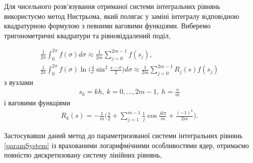 \documentclass[12pt]{report}
\begin{document}
Для чисельного розв'язування отриманої системи інтегральних рівнянь використуємо метод Нистрьома, який полягає у заміні інтегралу вiдповiдною квадратурною формулою з певними ваговими функцiями. Виберемо тригонометричні квадратури та рівновіддалений поділ,

\begin{gather}
 	\frac{1}{2\pi}\int_{0}^{2\pi}f(\sigma)d\sigma\approx\frac{1}{2m}\sum_{j=0}^{2m-1}f(s_j), \\
	\frac{1}{2\pi}\int_{0}^{2\pi}f(\sigma)\ln\bigg(\frac{4}{e}\sin^2\frac{s-\sigma}{2}\bigg)d\sigma\approx\frac{1}{2m}\sum_{j=0}^{2m-1}R_j(s)f(s_j)
 \end{gather}
 з вузлами
 \begin{gather}
 	s_k=kh, \ k=0,...,2m-1, \ h=\frac{\pi}{m}
  \end{gather}
  і ваговими функціями
  \begin{gather}
 	R_k(s)=-\frac{1}{m}\bigg(\frac{1}{2}+\sum_{j=1}^{m-1}\frac{1}{j}\cos \frac{jk\pi}{m}+ \frac{(-1)^k}{2m}\bigg).
  \end{gather}

Застосувавши даний метод до параметризованої системи інтегральних рівнянь \eqref{paramSystem} із врахованими логарифмічними особливостями ядер, отримаємо повністю дискретизовану систему лінійних рівнянь,
\end{document}
